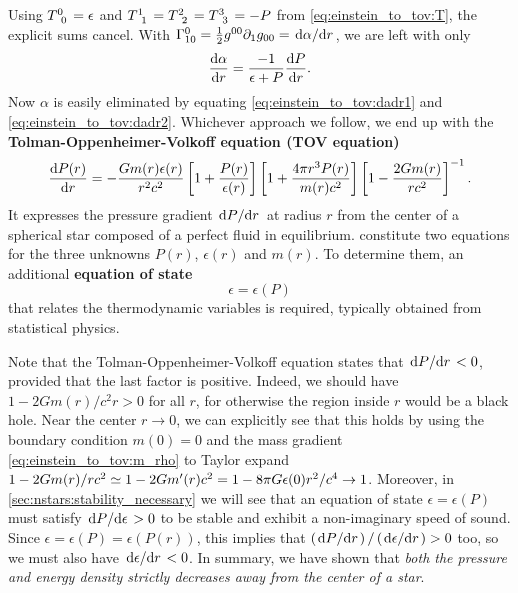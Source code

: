 Using $T\indices{^0_0} = \epsilon$ and $T\indices{^1_1} = T\indices{^2_2} = T\indices{^3_3} = -P$ from \cref{eq:einstein_to_tov:T}, the explicit sums cancel.
With $\Gamma^0_{10} = \frac12 g^{00} \partial_1 g_{00} = \odv{\alpha}/{r}$, we are left with only
\begin{equation}
	\odv{\alpha}{r} = \frac{-1}{\epsilon+P} \odv{P}{r} .
	\label{eq:einstein_to_tov:dadr2}
\end{equation}
Now $\alpha$ is easily eliminated by equating \eqref{eq:einstein_to_tov:dadr1} and \eqref{eq:einstein_to_tov:dadr2}. 
Whichever approach we follow, we end up with the \textbf{Tolman-Oppenheimer-Volkoff equation (TOV equation)}
\begin{equation}
	\odv{P(r)}{r} = -\frac{G m(r) \epsilon(r)}{r^2 c^2} \left[ 1 + \frac{P(r)}{\epsilon(r)} \right] \left[ 1 + \frac{4 \pi r^3 P(r)}{m(r) c^2} \right] \left[ 1 - \frac{2 G m(r)}{r c^2} \right]^{-1} .
	\label{eq:tov}
\end{equation}
It expresses the pressure gradient $\odv{P}/{r}$ at radius $r$ from the center of a spherical star composed of a perfect fluid in equilibrium.
 constitute two equations for the three unknowns $P(r)$, $\epsilon(r)$ and $m(r)$.
To determine them, an additional \textbf{equation of state}
\begin{equation}
	\epsilon = \epsilon(P)
\label{eq:tov:eos}
\end{equation}
that relates the thermodynamic variables is required, typically obtained from statistical physics.

Note that the Tolman-Oppenheimer-Volkoff equation states that $\odv{P}/{r} < 0$, provided that the last factor is positive.
Indeed, we should have $1 - 2 G m(r) / c^2 r > 0$ for all $r$, for otherwise the region inside $r$ would be a black hole.
Near the center $r \rightarrow 0$, we can explicitly see that this holds by using the boundary condition $m(0)=0$ and the mass gradient \eqref{eq:einstein_to_tov:m_rho} to Taylor expand $1 - 2 G m(r) / r c^2 \simeq 1 - 2 G m'(r) c^2 = 1 - 8 \pi G \epsilon(0) r^2 / c^4 \rightarrow 1$.
Moreover, in \cref{sec:nstars:stability_necessary} we will see that an equation of state $\epsilon = \epsilon(P)$ must satisfy $\odv{P}/{\epsilon} > 0$ to be stable and exhibit a non-imaginary speed of sound.
Since $\epsilon = \epsilon(P) = \epsilon(P(r))$, this implies that $\left( \odv{P}/{r} \right) / \left( \odv{\epsilon}/{r} \right) > 0$ too, so we must also have $\odv{\epsilon}/{r} < 0$.
In summary, we have shown that \emph{both the pressure and energy density strictly decreases away from the center of a star}.

